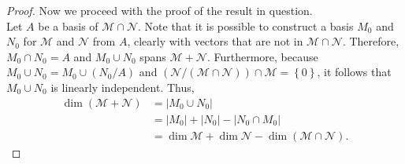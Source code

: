 \documentclass[12pt]{article}
\newcommand{\mc}[1]{\mathcal{#1}}
\newenvironment{problem}[2][Problem]{\begin{trivlist} \item[\hskip \labelsep {\bfseries #1}\hskip \labelsep {\bfseries #2.}]}{\end{trivlist}}
\begin{document}
\begin{problem}{7}
\begin{enumerate}
\begin{proof}
Now we proceed with the proof of the result in question.\\
Let $A$ be a  basis of $\mathcal{M}\cap\mathcal{N}$. Note that it is possible to construct a basis $M_{0}$ and $N_{0}$ for  $\mathcal{M}$ and $\mathcal{N}$ from $A$, clearly with vectors that are not in $\mathcal{M}\cap\mathcal{N}$. Therefore, $M_{0}\cap N_{0}=A$ and $M_{0}\cup N_{0}$ spans $\mathcal{M}+\mathcal{N}$. Furthermore, because $M_{0}\cup N_{0} = M_{0}\cup (N_{0}/A)$ and $(\mc{N}/(\mc{M}\cap \mc{N}))\cap \mc{M}=\left\{ 0 \right\}$, it follows that  $M_{0}\cup N_{0}$ is linearly independent. Thus,
\begin{align*}
  \dim{(\mc{M}+\mc{N})} &= |M_{0}\cup N_{0}|\\
  &= |M_{0}| + |N_{0}| - |N_{0}\cap M_{0}|\\
  &= \dim{\mc{M}} + \dim{\mc{N}} - \dim {(\mc{M}\cap \mc{N})}.
\end{align*}
\end{proof}
\end{enumerate}
\end{problem}
\end{document}
